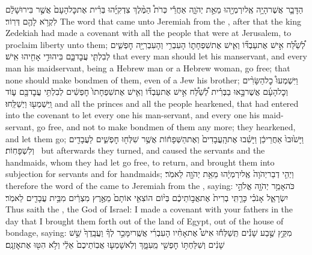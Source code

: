 \label{haft_18}
\setcounter{chap}{34}
\setcounter{verse}{8}
{הַדָּבָ֛ר אֲשֶׁר\maqqaf הָיָ֥ה אֶֽל\maqqaf יִרְמְיָ֖הוּ מֵאֵ֣ת יְהֹוָ֑ה אַחֲרֵ֡י כְּרֹת֩ הַמֶּ֨לֶךְ צִדְקִיָּ֜הוּ בְּרִ֗ית אֶת\maqqaf כׇּל\maqqaf הָעָם֙ אֲשֶׁ֣ר בִּירוּשָׁלַ֔͏ִם לִקְרֹ֥א לָהֶ֖ם דְּרֽוֹר׃}
{The word that came unto Jeremiah from the \lord, after that the king Zedekiah had made a covenant with all the people that were at Jerusalem, to proclaim liberty unto them;}
{לְ֠שַׁלַּ֠ח אִ֣ישׁ אֶת\maqqaf עַבְדּ֞וֹ וְאִ֧ישׁ אֶת\maqqaf שִׁפְחָת֛וֹ הָעִבְרִ֥י וְהָעִבְרִיָּ֖ה חׇפְשִׁ֑ים לְבִלְתִּ֧י עֲבׇד\maqqaf בָּ֛ם בִּיהוּדִ֥י אָחִ֖יהוּ אִֽישׁ׃}
{that every man should let his manservant, and every man his maidservant, being a Hebrew man or a Hebrew woman, go free; that none should make bondmen of them, even of a Jew his brother;}
{וַיִּשְׁמְעוּ֩ כׇל\maqqaf הַשָּׂרִ֨ים וְכׇל\maqqaf הָעָ֜ם אֲשֶׁר\maqqaf בָּ֣אוּ בַבְּרִ֗ית לְ֠שַׁלַּ֠ח אִ֣ישׁ אֶת\maqqaf עַבְדּ֞וֹ וְאִ֤ישׁ אֶת\maqqaf שִׁפְחָתוֹ֙ חׇפְשִׁ֔ים לְבִלְתִּ֥י עֲבׇד\maqqaf בָּ֖ם ע֑וֹד וַֽיִּשְׁמְע֖וּ וַיְשַׁלֵּֽחוּ׃}
{and all the princes and all the people hearkened, that had entered into the covenant to let every one his man-servant, and every one his maid-servant, go free, and not to make bondmen of them any more; they hearkened, and let them go;}
{וַיָּשׁ֙וּבוּ֙ אַחֲרֵי\maqqaf כֵ֔ן וַיָּשִׁ֗בוּ אֶת\maqqaf הָֽעֲבָדִים֙ וְאֶת\maqqaf הַשְּׁפָח֔וֹת אֲשֶׁ֥ר שִׁלְּח֖וּ חׇפְשִׁ֑ים  לַעֲבָדִ֖ים וְלִשְׁפָחֽוֹת׃ \petucha }
{but afterwards they turned, and caused the servants and the handmaids, whom they had let go free, to return, and brought them into subjection for servants and for handmaids;}
{וַיְהִ֤י דְבַר\maqqaf יְהֹוָה֙ אֶֽל\maqqaf יִרְמְיָ֔הוּ מֵאֵ֥ת יְהֹוָ֖ה לֵאמֹֽר׃}
{therefore the word of the \lord\space came to Jeremiah from the \lord, saying:}
{כֹּה\maqqaf אָמַ֥ר יְהֹוָ֖ה אֱלֹהֵ֣י יִשְׂרָאֵ֑ל אָנֹכִ֗י כָּרַ֤תִּֽי בְרִית֙ אֶת\maqqaf אֲב֣וֹתֵיכֶ֔ם בְּי֨וֹם הוֹצִאִ֤י אוֹתָם֙ מֵאֶ֣רֶץ מִצְרַ֔יִם מִבֵּ֥ית עֲבָדִ֖ים לֵאמֹֽר׃}
{Thus saith the \lord, the God of Israel: I made a covenant with your fathers in the day that I brought them forth out of the land of Egypt, out of the house of bondage, saying:}
{מִקֵּ֣ץ שֶׁ֣בַע שָׁנִ֡ים תְּֽשַׁלְּח֡וּ אִישׁ֩ אֶת\maqqaf אָחִ֨יו הָעִבְרִ֜י אֲשֶֽׁר\maqqaf יִמָּכֵ֣ר לְךָ֗ וַעֲבָֽדְךָ֙ שֵׁ֣שׁ שָׁנִ֔ים וְשִׁלַּחְתּ֥וֹ חׇפְשִׁ֖י מֵֽעִמָּ֑ךְ וְלֹֽא\maqqaf שָׁמְע֤וּ אֲבֽוֹתֵיכֶם֙ אֵלַ֔י וְלֹ֥א הִטּ֖וּ אֶת\maqqaf אׇזְנָֽם׃}
